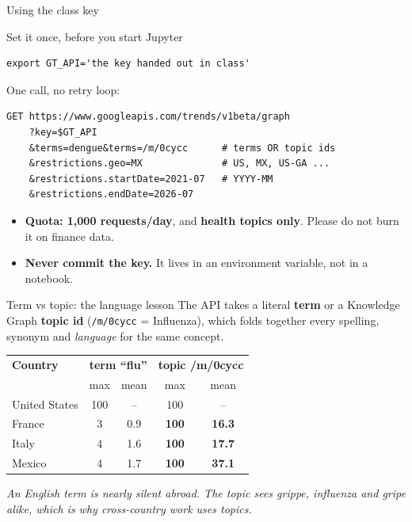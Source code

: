 \documentclass[aspectratio=169,11pt]{beamer}
\begin{document}
\begin{frame}[fragile]{Using the class key}
  \begin{block}{Set it once, before you start Jupyter}
  \begin{lstlisting}
export GT_API='the key handed out in class'
  \end{lstlisting}
  \end{block}
  One call, no retry loop:
  \begin{lstlisting}
GET https://www.googleapis.com/trends/v1beta/graph
    ?key=$GT_API
    &terms=dengue&terms=/m/0cycc      # terms OR topic ids
    &restrictions.geo=MX              # US, MX, US-GA ...
    &restrictions.startDate=2021-07   # YYYY-MM
    &restrictions.endDate=2026-07
  \end{lstlisting}
  \begin{itemize}
    \item \textbf{Quota: 1,000 requests/day}, and \textbf{health topics only}. Please do not
          burn it on finance data.
    \item \textbf{Never commit the key.} It lives in an environment variable, not in a
          notebook.
  \end{itemize}
\end{frame}

\begin{frame}{Term vs topic: the language lesson}
  The API takes a literal \textbf{term} or a Knowledge Graph \textbf{topic id}
  (\texttt{/m/0cycc} = Influenza), which folds together every spelling, synonym and
  \emph{language} for the same concept.
  \begin{center}
  \footnotesize
  \begin{tabular}{lcccc}
    \hline
    \textbf{Country} & \multicolumn{2}{c}{\textbf{term ``flu''}} & \multicolumn{2}{c}{\textbf{topic /m/0cycc}} \\
                     & max & mean & max & mean \\
    \hline
    United States & 100 & --   & 100 & -- \\
    France        & 3   & 0.9  & \textbf{100} & \textbf{16.3} \\
    Italy         & 4   & 1.6  & \textbf{100} & \textbf{17.7} \\
    Mexico        & 4   & 1.7  & \textbf{100} & \textbf{37.1} \\
    \hline
  \end{tabular}
  \end{center}
  \vspace{0.2em}
  \begin{center}
    \itshape An English term is nearly silent abroad. The topic sees \emph{grippe},
    \emph{influenza} and \emph{gripe} alike, which is why cross-country work uses topics.
  \end{center}
\end{frame}
\end{document}
